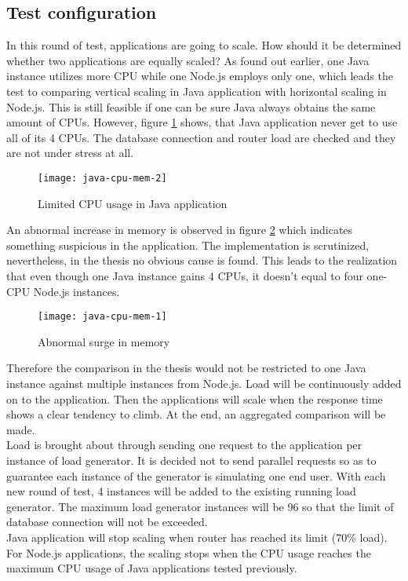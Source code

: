 \subsection{Test configuration}
 In this round of test, applications are going to scale. How should it be determined whether two applications are equally scaled? As found out earlier, one Java instance utilizes more CPU while one Node.js employs only one, which leads the test to comparing vertical scaling in Java application with horizontal scaling in Node.js. This is still feasible if one can be sure Java always obtains the same amount of CPUs. However, figure \ref{java-cpu-limit} shows, that Java application never get to use all of its 4 CPUs. The database connection and router load are checked and they are not under stress at all.  
 
 \begin{figure}[h]
 	\centering
 	\texttt{[image: java-cpu-mem-2]}
 	\caption{Limited CPU usage in Java application}
 	\label{java-cpu-limit}
 \end{figure}
An abnormal increase in memory is observed in figure \ref{java-mem-surge} which indicates something suspicious in the application. The implementation is scrutinized, nevertheless, in the thesis no obvious cause is found. This leads to the realization that even though one Java instance gains 4 CPUs, it doesn't equal to four one-CPU Node.js instances. 
 \begin{figure}[h]
	\centering
	\texttt{[image: java-cpu-mem-1]}
	\caption{Abnormal surge in memory}
	\label{java-mem-surge}
\end{figure}
Therefore the comparison in the thesis would not be restricted to one Java instance against multiple instances from Node.js. Load will be continuously added on to the application. Then the applications will scale when the response time shows a clear tendency to climb. At the end, an aggregated comparison will be made. \\
Load is brought about through sending one request to the application per instance of load generator. It is decided not to send parallel requests so as to guarantee each instance of the generator is simulating one end user. With each new round of test, 4 instances will be added to the existing running load generator. The maximum load generator instances will be 96 so that the limit of database connection will not be exceeded.\\
Java application will stop scaling when router has reached its limit (70\% load). For Node.js applications, the scaling stops when the CPU usage reaches the maximum CPU usage of Java applications tested previously.
 
